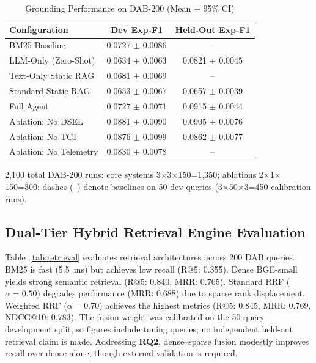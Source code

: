 \documentclass[conference]{IEEEtran}
\begin{document}
\begin{table}[ht]
\caption{Grounding Performance on DAB-200 (Mean $\pm$ 95\% CI)}
\label{tab:main}
\centering
\footnotesize
\setlength{\tabcolsep}{4pt}
\begin{tabular*}{\columnwidth}{@{\extracolsep{\fill}}lcc@{}}
\toprule
Configuration & Dev Exp-F1 & Held-Out Exp-F1 \\
\midrule
BM25 Baseline & 0.0727 $\pm$ 0.0086 & -- \\
LLM-Only (Zero-Shot) & 0.0634 $\pm$ 0.0063 & 0.0821 $\pm$ 0.0045 \\
Text-Only Static RAG & 0.0681 $\pm$ 0.0069 & -- \\
Standard Static RAG & 0.0653 $\pm$ 0.0067 & 0.0657 $\pm$ 0.0039 \\
Full Agent & 0.0727 $\pm$ 0.0071 & 0.0915 $\pm$ 0.0044 \\
\midrule
Ablation: No DSEL & 0.0881 $\pm$ 0.0090 & 0.0905 $\pm$ 0.0076 \\
Ablation: No TGI & 0.0876 $\pm$ 0.0099 & 0.0862 $\pm$ 0.0077 \\
Ablation: No Telemetry & 0.0830 $\pm$ 0.0078 & -- \\
\bottomrule
\end{tabular*}
\vspace{2pt}
\raggedright{\scriptsize 2,100 total DAB-200 runs: core systems 3$\times$3$\times$150=1,350; ablations 2$\times$1$\times$150=300; dashes (--) denote baselines on 50 dev queries (3$\times$50$\times$3=450 calibration runs).}
\end{table}

\subsection{Dual-Tier Hybrid Retrieval Engine Evaluation}
Table~\ref{tab:retrieval} evaluates retrieval architectures across 200 DAB queries. BM25 is fast (5.5~ms) but achieves low recall (R@5: 0.355). Dense BGE-small yields strong semantic retrieval (R@5: 0.840, MRR: 0.765). Standard RRF ($\alpha=0.50$) degrades performance (MRR: 0.688) due to sparse rank displacement. Weighted RRF ($\alpha=0.70$) achieves the highest metrics (R@5: 0.845, MRR: 0.769, NDCG@10: 0.783). The fusion weight was calibrated on the 50-query development split, so figures include tuning queries; no independent held-out retrieval claim is made. Addressing \textbf{RQ2}, dense--sparse fusion modestly improves recall over dense alone, though external validation is required.
\end{document}
